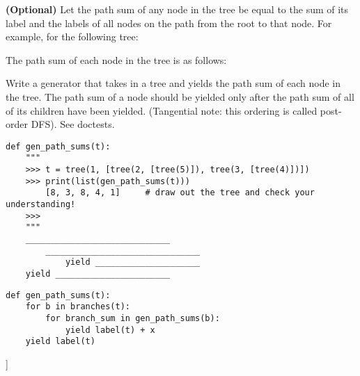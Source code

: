 \begin{blocksection}
\question \textbf{(Optional)} 
Let the path sum of any node in the tree be equal to the sum of its label and the labels of all nodes on the path from the root to that node. For example, for the following tree:

The path sum of each node in the tree is as follows:


Write a generator that takes in a tree and yields the path sum of each node in the tree. The path sum of a node should be yielded only after the path sum of all of its children have been yielded. (Tangential note: this ordering is called post-order DFS). See doctests.

\newline

\begin{lstlisting}
def gen_path_sums(t):
    """
    >>> t = tree(1, [tree(2, [tree(5)]), tree(3, [tree(4)])])
    >>> print(list(gen_path_sums(t)))
       	[8, 3, 8, 4, 1]  	# draw out the tree and check your understanding!
    >>> 
    """    
    _____________________________
    	_______________________________
    		yield _____________________
    yield _______________________
\end{lstlisting}

\begin{solution}[0.5in]
\begin{lstlisting}
def gen_path_sums(t):
    for b in branches(t):
        for branch_sum in gen_path_sums(b):
            yield label(t) + x
    yield label(t)
\end{lstlisting}

\end{solution}
\end{blocksection}

]